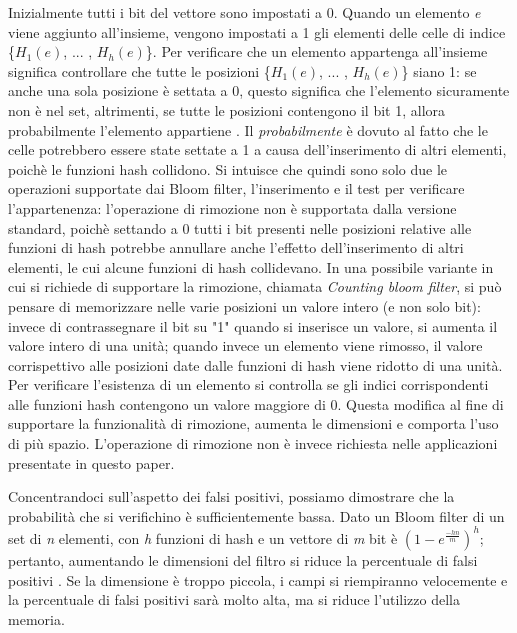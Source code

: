 \documentclass[../main.tex]{subfiles}
\begin{document}
Inizialmente tutti i bit del vettore sono impostati a 0. Quando un elemento \textit{e} viene aggiunto all'insieme, vengono impostati a 1 gli elementi delle celle di indice \{$H_{1}(e)$, ... , $H_{h}(e)$\}. Per verificare che un elemento appartenga all'insieme significa controllare che tutte le posizioni \{$H_{1}(e)$, ... , $H_{h}(e)$\} siano 1: se anche una sola posizione è settata a 0, questo significa che l'elemento sicuramente non è nel set, altrimenti, se tutte le posizioni contengono il bit 1, allora probabilmente l'elemento appartiene \cite{compressedbloomfilter}. Il \textit{probabilmente} è dovuto al fatto che le celle potrebbero essere state settate a 1 a causa dell'inserimento di altri elementi, poichè le funzioni hash collidono. Si intuisce che quindi sono solo due le operazioni supportate dai Bloom filter, l'inserimento e il test per verificare l'appartenenza: l'operazione di rimozione non è supportata dalla versione standard, poichè settando a 0 tutti i bit presenti nelle posizioni relative alle funzioni di hash potrebbe annullare anche l'effetto dell'inserimento di altri elementi, le cui alcune funzioni di hash collidevano. In una possibile variante in cui si richiede di supportare la rimozione, chiamata \textit{Counting bloom filter}, si può pensare di memorizzare nelle varie posizioni un valore intero (e non solo bit): invece di contrassegnare il bit su "1" quando si inserisce un valore, si aumenta il valore intero di una unità; quando invece un elemento viene rimosso, il valore corrispettivo alle posizioni date dalle funzioni di hash viene ridotto di una unità. Per verificare l'esistenza di un elemento si controlla se gli indici corrispondenti alle funzioni hash contengono un valore maggiore di 0. Questa modifica al fine di supportare la funzionalità di rimozione, aumenta le dimensioni e comporta l'uso di più spazio. L'operazione di rimozione non è invece richiesta nelle applicazioni presentate in questo paper.

Concentrandoci sull'aspetto dei falsi positivi, possiamo dimostrare che la probabilità che si verifichino è sufficientemente bassa. Dato un Bloom filter di un set di \textit{n} elementi, con \textit{h} funzioni di hash e un vettore di \textit{m} bit è $(1 - e^{\frac{-hn}{m}})^{h} $; pertanto, aumentando le dimensioni del filtro si riduce la percentuale di falsi positivi \cite{bernardini2019malva} \cite{compressedbloomfilter}. Se la dimensione è troppo piccola, i campi si riempiranno velocemente e la percentuale di falsi positivi sarà molto alta, ma si riduce l'utilizzo della memoria. 
\end{document}
